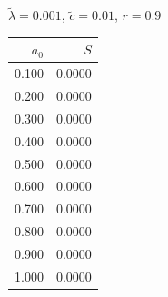 \documentclass[11pt,a4paper]{article}
\begin{document}
\begin{minipage}[t]{\textwidth}
\begin{minipage}[t]{0.32\textwidth}
        \footnotesize
        \begin{flushleft}$\tilde{\lambda}=0.001$, $\tilde{c}=0.01$, $r=0.9$\end{flushleft}
        \begin{tabular}[t]{rr}
            $a_0$ & $S$ \\
            \hline
             0.100 & 0.0000 \\
             0.200 & 0.0000 \\
             0.300 & 0.0000 \\
             0.400 & 0.0000 \\
             0.500 & 0.0000 \\
             0.600 & 0.0000 \\
             0.700 & 0.0000 \\
             0.800 & 0.0000 \\
             0.900 & 0.0000 \\
             1.000 & 0.0000 \\
        \end{tabular}
    \end{minipage}
\end{minipage}
\end{document}
